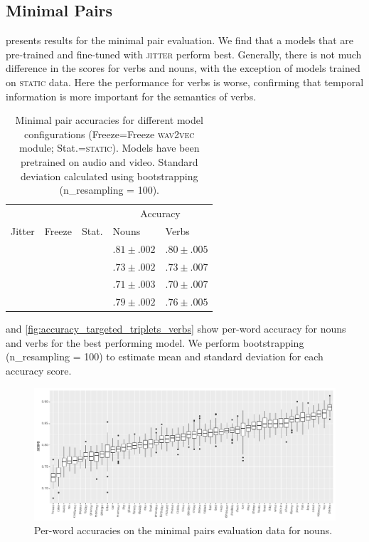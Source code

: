 \subsection{Minimal Pairs}
\label{sec:minimal-pairs}


 presents results for the minimal pair 
evaluation. We find that a models that are 
pre-trained and fine-tuned with \textsc{jitter} perform best. Generally, there 
is not much difference in the scores for verbs and nouns, with the exception of 
models trained on \textsc{static} data. Here the performance for verbs is 
worse, confirming that temporal information is more important for the semantics 
of verbs.
\begin{table}[ht]
	\centering
	\begin{tabular}{lllll}
		\toprule
		& & & \multicolumn{2}{c}{Accuracy} \\
		Jitter & Freeze & Stat. & Nouns & Verbs \\
		\midrule
		\checkmark &  &  & $.81 \pm .002$  & $.80 \pm .005$ \\
		 &  &  & $.73 \pm .002$ & $.73 \pm .007$  \\
		\checkmark & \checkmark &  & $.71 \pm .003$ & $.70 \pm .007$ \\
		\checkmark &  &  \checkmark & $.79 \pm .002$ & $.76 \pm .005$ \\
		\bottomrule
	\end{tabular}
	\caption{Minimal pair accuracies for different model configurations 
	(Freeze=Freeze \textsc{wav2vec} module; Stat.=\textsc{static}). Models 
	have been pretrained on audio and video. Standard deviation calculated 
	using bootstrapping (n\_resampling = 100).}
	\label{tab:minimal_pair_results}
\end{table}

 and
\ref{fig:accuracy_targeted_triplets_verbs} show per-word
accuracy for nouns and verbs for the best performing model.
We perform bootstrapping (n\_resampling = 100) to estimate mean and standard 
deviation for each accuracy score.


\begin{figure}[htb]
  \centering
  \includegraphics[width=\textwidth]{results/targeted_triplets/results_per_word_version_335_NOUN.pdf}
  \caption{Per-word accuracies on the minimal pairs evaluation data for nouns.}
  \label{fig:accuracy_targeted_triplets_nouns}
\end{figure}


